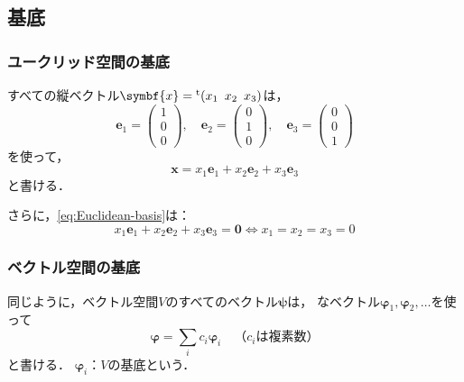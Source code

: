 \documentclass[
    10pt,
    ]{sotsu-beamer}
\begin{document}
\subsection{基底}

\begin{frame}
    \frametitle{ユークリッド空間の基底}

    すべての縦ベクトル$\symbf{x} = \cvector{x_1 ; x_2 ; x_3}$は，
    \begin{equation}
        \label{eq:Euclidean-basis}
        \symbf{e}_1 = \begin{pmatrix} 1 \\ 0 \\ 0 \end{pmatrix}, \quad 
        \symbf{e}_2 = \begin{pmatrix} 0 \\ 1 \\ 0 \end{pmatrix}, \quad 
        \symbf{e}_3 = \begin{pmatrix} 0 \\ 0 \\ 1 \end{pmatrix}
    \end{equation}
    を使って，
    \begin{equation*}
        \symbf{x} = x_1 \symbf{e}_1 + x_2 \symbf{e}_2 + x_3 \symbf{e}_3
    \end{equation*}
    と書ける．

    さらに，\eqref{eq:Euclidean-basis}は：
    \begin{equation*}
        x_1 \symbf{e}_1 + x_2 \symbf{e}_2 + x_3 \symbf{e}_3 = \symbf{0}
        \iff
        x_1 = x_2 = x_3 = 0
    \end{equation*}

\end{frame}


\begin{frame}
    \frametitle{ベクトル空間の基底}

    同じように，ベクトル空間$V$の\alert{すべてのベクトル}$\symbf{\psi}$は，
    なベクトル$\symbf{\varphi}_1, \symbf{\varphi}_2, \dotsc$を使って
    \begin{equation}
        \label{eq:basis}
        \symbf{\varphi} = \sum_i c_i \symbf{\varphi}_i
        \quad \text{（$c_i$は複素数）}
    \end{equation}
    と書ける．
    \pause
    $\symbf{\varphi}_i$：$V$の\alert{基底}という．

\end{frame}
\end{document}
